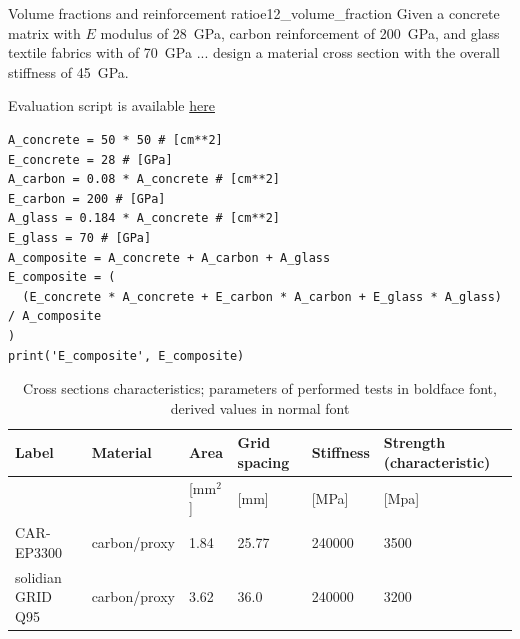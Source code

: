 \documentclass[main.tex]{subfiles}
\begin{document}
\begin{bmcsex}{Volume fractions and reinforcement ratio}{e12_volume_fraction}
Given a concrete matrix with $E$ modulus of 28~GPa, carbon reinforcement of 
200~GPa, and glass textile fabrics with of 70~GPa  ... design a material cross section  
with the overall stiffness of 45~GPa.

Evaluation script is available \href{https://moodle.rwth-aachen.de/pluginfile.php/263167/mod_folder/content/0/Example%201.2%20-%20Calculate%20the%20cross%20sectional%20area%20of%20a%20component%20to%20achieve%20a%20desired%20stiffness.ipynb?forcedownload=1}{here}

\begin{lstlisting}
A_concrete = 50 * 50 # [cm**2]
E_concrete = 28 # [GPa]
A_carbon = 0.08 * A_concrete # [cm**2]
E_carbon = 200 # [GPa]
A_glass = 0.184 * A_concrete # [cm**2]
E_glass = 70 # [GPa]
A_composite = A_concrete + A_carbon + A_glass
E_composite = (
  (E_concrete * A_concrete + E_carbon * A_carbon + E_glass * A_glass) / A_composite
)
print('E_composite', E_composite)
\end{lstlisting}

\end{bmcsex}

\begin{table}[tb]
 \centering
 \caption{Cross sections characteristics; parameters of performed tests in boldface font, derived values in normal font}\label{t:cross_sections}
 \begingroup\setlength{\fboxsep}{0pt}
{\footnotesize
 \begin{tabular}{ m{3.2cm} m{2cm} m{2.1cm} m{2.0cm}  m{2.0cm} m{2.0cm}  }
    \toprule
    Label
    & Material
    & Area 
    & Grid spacing
    & Stiffness
    & Strength (characteristic)
    \\ 
  \hline 
    &     
    & [mm$^2$]
    & [mm]
    & [MPa]
    & [Mpa]
    \\ 
   \hline
    CAR-EP3300
    & carbon/proxy
    & 1.84
    & 25.77
    & 240000
    & 3500
    \\
   \hline
    solidian GRID Q95
    & carbon/proxy
    & 3.62
    & 36.0
    & 240000
    & 3200
    \\ \bottomrule
 \end{tabular}%
}\endgroup
\end{table}
\end{document}
